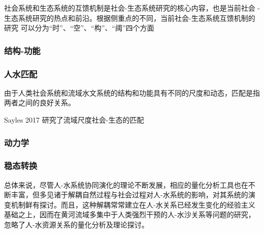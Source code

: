 社会系统和生态系统的互馈机制是社会-生态系统研究的核心内容，也是当前社会 -生态系统研究的热点和前沿。根据侧重点的不同，当前社会-生态系统互馈机制的研究 可以分为“时”、“空”、“构”、“阈”四个方面


\subsubsection*{结构-功能}

\subsubsection*{人水匹配}
由于人类社会系统和流域水文系统的结构和功能具有不同的尺度和动态，匹配是指两者之间的良好关系。

Sayles 2017 研究了流域尺度社会-生态的匹配

\subsubsection*{动力学}

\subsubsection*{稳态转换}

总体来说，尽管人-水系统协同演化的理论不断发展，相应的量化分析工具也在不断丰富，但多见诸于解耦自然过程与社会过程对人-水系统的影响，对其系统的演变机制鲜有探讨。而且，这种解耦常常建立在人-水关系已经发生变化的经验主义基础之上，因而在黄河流域多集中于人类强烈干预的人-水沙关系等问题的研究，忽略了人-水资源关系的量化分析及理论探讨。